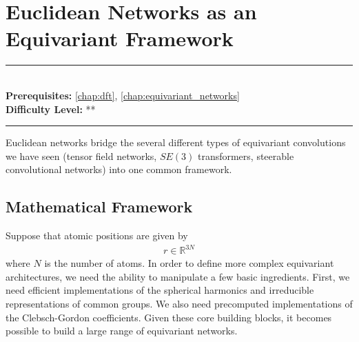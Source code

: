 \documentclass[book.tex]{subfiles}
\begin{document}
\chapter{Euclidean Networks as an Equivariant Framework}
\label{ch:dft_e3nn}

\label{chap:e3nn}
\noindent\rule{11cm}{0.4pt} \\
\textbf{Prerequisites:} \autoref{chap:dft}, \autoref{chap:equivariant_networks} \\
\textbf{Difficulty Level:} ** \\
\noindent\rule{11cm}{0.4pt}
\vspace{5mm}


Euclidean networks bridge the several different types of equivariant convolutions we have seen (tensor field networks, $SE(3)$ transformers, steerable convolutional networks) into one common framework.

\section{Mathematical Framework}

Suppose that atomic positions are given by
\begin{align}
r \in \mathbb{R}^{3N}
\end{align}
where $N$ is the number of atoms. In order to define more complex equivariant architectures, we need the ability to manipulate a few basic ingredients. First, we need efficient implementations of the spherical harmonics and irreducible representations of common groups. We also need precomputed implementations of the Clebsch-Gordon coefficients. Given these core building blocks, it becomes possible to build a large range of equivariant networks.
\end{document}
